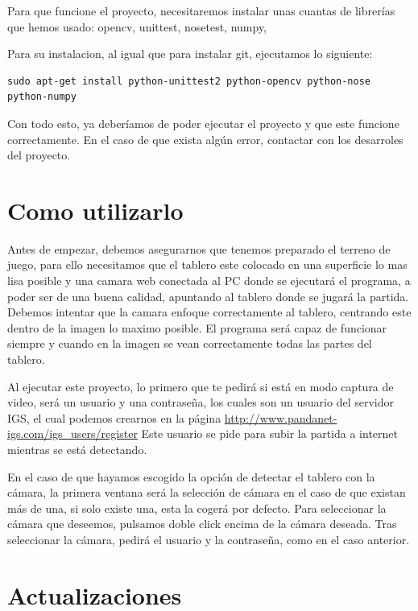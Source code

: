 \documentclass[12pt,a4paper]{report}
\begin{document}
Para que funcione el proyecto, necesitaremos instalar unas cuantas de librerías
que hemos usado: opencv, unittest, nosetest, numpy, 

Para su instalacion, al igual que para instalar git, ejecutamos lo siguiente:

\begin{verbatim}
sudo apt-get install python-unittest2 python-opencv python-nose python-numpy
\end{verbatim}

Con todo esto, ya deberíamos de poder ejecutar el proyecto y que este funcione
correctamente. En el caso de que exista algún error, contactar con los
desarroles del proyecto. 


\section{Como utilizarlo}

Antes de empezar, debemos asegurarnos que tenemos preparado el terreno de juego, para ello necesitamos que el tablero este colocado en una superficie lo mas lisa posible y una camara web conectada al PC donde se ejecutará el programa, a poder ser de una buena calidad, apuntando al tablero donde se jugará la partida. Debemos intentar que la camara enfoque correctamente al tablero, centrando este dentro de la imagen lo maximo posible. El programa será capaz de funcionar siempre y cuando en la imagen se vean correctamente todas las partes del tablero.

Al ejecutar este proyecto, lo primero que te pedirá si está en modo captura de
video, será un usuario y una contraseña, los cuales son un usuario del servidor
IGS, el cual podemos crearnos en la página 
\url{http://www.pandanet-igs.com/igs_users/register}
Este usuario se pide para subir la partida a internet mientras se está
detectando. 

En el caso de que hayamos escogido la opción de detectar el tablero con la
cámara, la primera ventana será la selección de cámara en el caso de que existan
más de una, si solo existe una, esta la cogerá por defecto. Para seleccionar la
cámara que deseemos, pulsamos doble click encima de la cámara deseada.  Tras
seleccionar la cámara, pedirá el usuario y la contraseña, como en el caso
anterior. 


\section{Actualizaciones}
\end{document}
